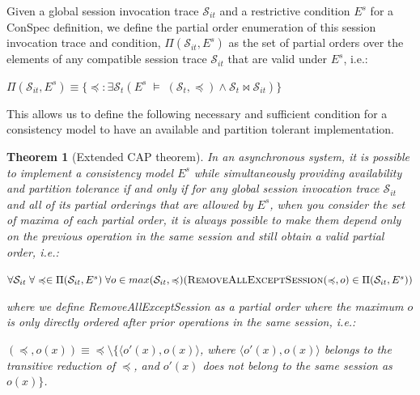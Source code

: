 \documentclass[journal,compsoc]{IEEEtran}
\newtheorem{theorem}{Theorem}[section]
\begin{document}
\begin{definition} \label{def:allpos}
Given a global session invocation trace $\mathcal{S}_{it}$ and a restrictive condition $E^s$
for a ConSpec definition, we define the partial order enumeration
of this session invocation trace and condition, $\Pi(\mathcal{S}_{it},E^s)$ as
the set of partial orders over the elements of any compatible session trace $\mathcal{S}_{it}$ that are valid
under $E^s$, i.e.:


$\Pi(\mathcal{S}_{it},E^s) \equiv  \{\preccurlyeq: \exists \mathcal{S}_{t} \left(  E^s\; \vDash \; \left( {\mathcal{S}_{t}}, \preccurlyeq \right) \wedge \mathcal{S}_{t}\bowtie \mathcal{S}_{it} \right) \}$
\end{definition}

This allows us to define the following necessary and sufficient condition
for a consistency model to have an available and partition tolerant
implementation.

\begin{theorem}[Extended CAP theorem] 
In an asynchronous system, it is possible to implement a consistency model $E^s$ while simultaneously providing availability and partition tolerance if and only if for any global session invocation trace $\mathcal{S}_{it}$ and all of its partial orderings that are allowed by $E^s$, when you consider the set of maxima of each partial order, it is always possible to make them depend only on the previous operation in the same session and still obtain a valid partial order, i.e.:


 $\forall \mathcal{S}_{it} \; \forall \preccurlyeq \in \Pi(\mathcal{S}_{it},E^s) \; \forall o \in max(\mathcal{S}_{it}, \preccurlyeq) \\ (\textsc{RemoveAllExceptSession}(\preccurlyeq,o) \in \Pi(\mathcal{S}_{it},E^s) ) $

where we define {\sc RemoveAllExceptSession} as a partial order where the maximum $o$ is only directly ordered after prior operations in the same session, i.e.:

$(\preccurlyeq,o(x)) \equiv \preccurlyeq \setminus \{ \langle o'(x),o(x) \rangle$, where $\langle o'(x),o(x) \rangle$ belongs to the transitive reduction of $\preccurlyeq$, and $o'(x)$ does not belong to the same session as $o(x)\}$.



 \end{theorem} \label{thrm:cap}
\end{document}
